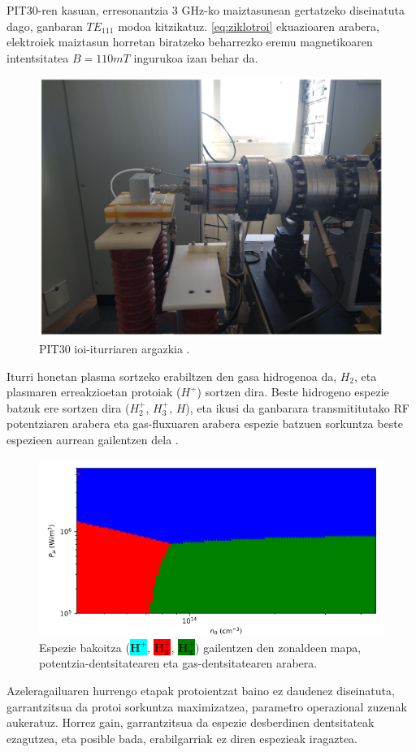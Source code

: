 \documentclass[12pt]{article}
\numberwithin{figure}{section}
\numberwithin{equation}{section}
\begin{document}
\newpage
PIT30-ren kasuan, erresonantzia 3 GHz-ko maiztasunean gertatzeko diseinatuta dago, ganbaran $TE_{111}$ modoa kitzikatuz. \eqref{eq:ziklotroi} ekuazioaren arabera, elektroiek maiztasun horretan biratzeko beharrezko eremu magnetikoaren intentsitatea $B=110mT$ ingurukoa izan behar da.

\begin{figure}[h]
    \centering
    \includegraphics[width=0.5\linewidth]{1 - Sarrera/pit30argazkia.png}
    \caption{PIT30 ioi-iturriaren argazkia \cite{feuchtwanger_new_2022}.}
    \label{fig:pit30iturria}
\end{figure}

Iturri honetan plasma sortzeko erabiltzen den gasa hidrogenoa da, $H_2$, eta plasmaren erreakzioetan protoiak ($H^+$) sortzen dira. Beste hidrogeno espezie batzuk ere sortzen dira ($H_2^+$, $H_3^+$, $H$), eta ikusi da ganbarara transmititutako RF potentziaren arabera eta gas-fluxuaren arabera espezie batzuen sorkuntza beste espezieen aurrean gailentzen dela \cite{elorza_romera_modelo_2022}.

\begin{figure}[h]
    \centering
    \includegraphics[width=0.8\linewidth]{1 - Sarrera/predominant_map.PNG}
    \caption{Espezie bakoitza (\colorbox{cyan}{$\mathbf{H_{ }^+}$}, \colorbox{red}{$\mathbf{H_2^+}$}, \colorbox{green}{$\mathbf{H_3^+}$}) gailentzen den zonaldeen mapa, potentzia-dentsitatearen eta gas-dentsitatearen arabera.}
    \label{fig:mapa}
\end{figure}
Azeleragailuaren hurrengo etapak protoientzat baino ez daudenez diseinatuta, garrantzitsua da protoi sorkuntza maximizatzea, parametro operazional zuzenak aukeratuz. Horrez gain, garrantzitsua da espezie desberdinen dentsitateak ezagutzea, eta posible bada, erabilgarriak ez diren espezieak iragaztea.
\newpage
\end{document}
